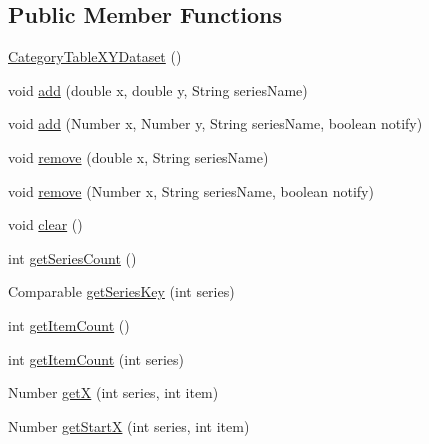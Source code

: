 \subsection*{Public Member Functions}
\begin{DoxyCompactItemize}
\item 
\mbox{\hyperlink{classorg_1_1jfree_1_1data_1_1xy_1_1_category_table_x_y_dataset_a05f2bc22c5ff51788de7254707687677}{Category\+Table\+X\+Y\+Dataset}} ()
\item 
void \mbox{\hyperlink{classorg_1_1jfree_1_1data_1_1xy_1_1_category_table_x_y_dataset_a74d9c59592f39d5cfd0db02f5047161b}{add}} (double x, double y, String series\+Name)
\item 
void \mbox{\hyperlink{classorg_1_1jfree_1_1data_1_1xy_1_1_category_table_x_y_dataset_af9afb3580eced58e0044546e393e94eb}{add}} (Number x, Number y, String series\+Name, boolean notify)
\item 
void \mbox{\hyperlink{classorg_1_1jfree_1_1data_1_1xy_1_1_category_table_x_y_dataset_afcd31cbf93ad8bead5156ce2eddb259b}{remove}} (double x, String series\+Name)
\item 
void \mbox{\hyperlink{classorg_1_1jfree_1_1data_1_1xy_1_1_category_table_x_y_dataset_af74a6daf43012353d02f13c6a4f4945e}{remove}} (Number x, String series\+Name, boolean notify)
\item 
void \mbox{\hyperlink{classorg_1_1jfree_1_1data_1_1xy_1_1_category_table_x_y_dataset_a47c9a31208e277db7c2fb722f5404887}{clear}} ()
\item 
int \mbox{\hyperlink{classorg_1_1jfree_1_1data_1_1xy_1_1_category_table_x_y_dataset_a95fbc1a24943e6a3f780f0273bbb55e8}{get\+Series\+Count}} ()
\item 
Comparable \mbox{\hyperlink{classorg_1_1jfree_1_1data_1_1xy_1_1_category_table_x_y_dataset_afc6ee3d37adf99d733ebf0289f6e6ffb}{get\+Series\+Key}} (int series)
\item 
int \mbox{\hyperlink{classorg_1_1jfree_1_1data_1_1xy_1_1_category_table_x_y_dataset_ae1129096e67aae2724cfe36586062443}{get\+Item\+Count}} ()
\item 
int \mbox{\hyperlink{classorg_1_1jfree_1_1data_1_1xy_1_1_category_table_x_y_dataset_a4e9554da109c26a84321724a1a06bd27}{get\+Item\+Count}} (int series)
\item 
Number \mbox{\hyperlink{classorg_1_1jfree_1_1data_1_1xy_1_1_category_table_x_y_dataset_ac4f984661a2f855b1e4a82d05731b1f4}{getX}} (int series, int item)
\item 
Number \mbox{\hyperlink{classorg_1_1jfree_1_1data_1_1xy_1_1_category_table_x_y_dataset_ad3ea675c3e162845c8055b7411003e0a}{get\+StartX}} (int series, int item)

\end{DoxyCompactItemize}
